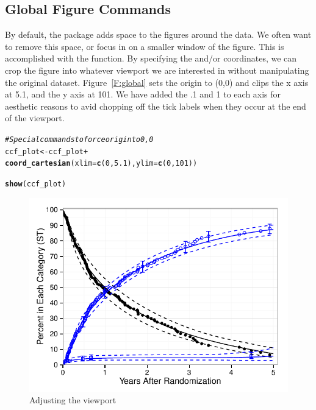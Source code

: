 \documentclass[nojss]{jss}\usepackage[]{graphicx}\usepackage[]{color}
\makeatletter
\def\maxwidth{ %
  \ifdim\Gin@nat@width>\linewidth
    \linewidth
  \else
    \Gin@nat@width
  \fi
}
\newcommand{\hlnum}[1]{\textcolor[rgb]{0.686,0.059,0.569}{#1}}%
\newcommand{\hlcom}[1]{\textcolor[rgb]{0.678,0.584,0.686}{\textit{#1}}}%
\newcommand{\hlopt}[1]{\textcolor[rgb]{0,0,0}{#1}}%
\newcommand{\hlstd}[1]{\textcolor[rgb]{0.345,0.345,0.345}{#1}}%
\newcommand{\hlkwb}[1]{\textcolor[rgb]{0.69,0.353,0.396}{#1}}%
\newcommand{\hlkwc}[1]{\textcolor[rgb]{0.333,0.667,0.333}{#1}}%
\newcommand{\hlkwd}[1]{\textcolor[rgb]{0.737,0.353,0.396}{\textbf{#1}}}%
\newenvironment{kframe}{%
 \def\at@end@of@kframe{}%
 \ifinner\ifhmode%
  \def\at@end@of@kframe{\end{minipage}}%
  \begin{minipage}{\columnwidth}%
 \fi\fi%
 \def\FrameCommand##1{\hskip\@totalleftmargin \hskip-\fboxsep
 \colorbox{shadecolor}{##1}\hskip-\fboxsep
     \hskip-\linewidth \hskip-\@totalleftmargin \hskip\columnwidth}%
 \MakeFramed {\advance\hsize-\width
   \@totalleftmargin\z@ \linewidth\hsize
   \@setminipage}}%
 {\par\unskip\endMakeFramed%
 \at@end@of@kframe}
\newenvironment{knitrout}{}{} %
\makeatother
\begin{document}
\subsection{Global Figure Commands}\label{S:globals}
By default, the  package adds space to the figures around the data. We often want to remove this space, or focus in on a smaller window of the figure. This is accomplished with the  function. By specifying the  and/or  coordinates, we can crop the figure into whatever viewport we are interested in without manipulating the original dataset. Figure~\ref{F:global} sets the origin to (0,0) and clips the x axis at 5.1, and the y axis at 101. We have added the .1 and 1 to each axis for aesthetic reasons to avid chopping off the tick labels when they occur at the end of the viewport.
\begin{knitrout}\footnotesize
{}\color{fgcolor}\begin{kframe}
\begin{alltt}
\hlcom{# Special commands to force origin to 0,0}
\hlstd{ccf_plot} \hlkwb{<-} \hlstd{ccf_plot} \hlopt{+}
  \hlkwd{coord_cartesian}\hlstd{(}\hlkwc{xlim}\hlstd{=}\hlkwd{c}\hlstd{(}\hlnum{0}\hlstd{,}\hlnum{5.1}\hlstd{),} \hlkwc{ylim}\hlstd{=}\hlkwd{c}\hlstd{(}\hlnum{0}\hlstd{,}\hlnum{101}\hlstd{))}

\hlkwd{show}\hlstd{(ccf_plot)}
\end{alltt}
\end{kframe}\begin{figure}[htpb]


{\centering \includegraphics[width=\maxwidth]{figure/beamer-global_} 

}

\caption[Adjusting the viewport]{Adjusting the viewport\label{F:global,}}
\end{figure}


\end{knitrout}
\end{document}

